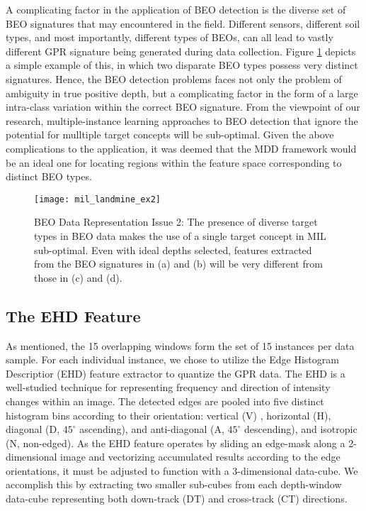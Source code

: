 \documentclass[12pt,dvips]{report}
\numberwithin{equation}{section}
\begin{document}
A complicating factor in the application of BEO detection is the diverse set of BEO signatures that may encountered in the field.  Different sensors, different soil types, and most importantly, different types of BEOs, can all lead to vastly different GPR signature being generated during data collection.  Figure \ref{fig:Landmine-Detection-Ex2_Experimental} depicts a simple example of this, in which two disparate BEO types possess very distinct signatures.  Hence, the BEO detection problems faces not only the problem of ambiguity in true positive depth, but a complicating factor in the form of a large intra-class variation within the correct BEO signature.  From the viewpoint of our research, multiple-instance learning approaches to BEO detection that ignore the potential for mulltiple target concepts will be sub-optimal.  Given the above complications to the application, it was deemed that the MDD framework would be an ideal one for locating regions within the feature space corresponding to distinct BEO types.  

\begin{figure}
\texttt{[image: mil\_landmine\_ex2]}

\caption{BEO Data Representation Issue 2: The presence of diverse target types
in BEO data makes the use of a single target concept in MIL sub-optimal.
Even with ideal depths selected, features extracted from the BEO signatures in (a) and (b) will be very different from those in (c) and (d). \label{fig:Landmine-Detection-Ex2_Experimental}}
\end{figure}

\subsection{The EHD Feature} \label{subsec:EHDFeatureDesc}

As mentioned, the 15 overlapping windows form the set of 15 instances per data sample.  For each individual instance, we chose to utilize the Edge Histogram Descriptior (EHD) feature extractor \cite{friguipaul2009} to quantize the GPR data.  The EHD is a well-studied technique for representing frequency and direction of intensity changes within an image.  The detected edges are pooled into five distinct histogram bins according to their orientation: vertical (V) , horizontal (H), diagonal (D, $45^{\circ}$ ascending), and anti-diagonal (A, $45^{\circ}$ descending), and isotropic (N, non-edged).  As the  EHD feature operates by sliding an edge-mask along a 2-dimensional image and vectorizing accumulated results according to the edge orientations, it must be adjusted to function with a 3-dimensional data-cube.  We accomplish this by extracting two smaller sub-cubes from each depth-window data-cube representing both down-track (DT) and cross-track (CT) directions.  
\end{document}
